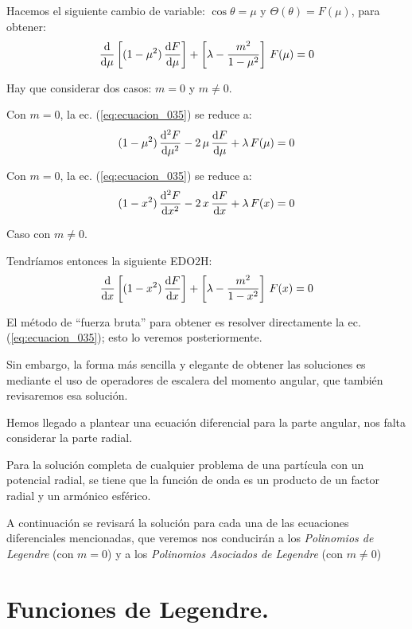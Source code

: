 Hacemos el siguiente cambio de variable: $\cos \theta = \mu$ y $\Theta(\theta) = F(\mu)$, para obtener:
\begin{align}
\dv{\mu} \left[ (1 - \mu^{2}) \, \dv{F}{\mu} \right] + \left[ \lambda - \dfrac{m^{2}}{1 - \mu^{2}} \right] \, F(\mu) = 0
\label{eq:ecuacion_035}
\end{align}

Hay que considerar dos casos: $m = 0$ y $m \neq 0$.
\par
Con $m = 0$, la ec. (\ref{eq:ecuacion_035}) se reduce a:
\begin{align}
(1 - \mu^{2}) \, \dv[2]{F}{\mu} - 2  \, \mu \, \dv{F}{\mu} + \lambda \, F(\mu) = 0
\label{eq:ecuacion_036a}
\end{align}

Con $m = 0$, la ec. (\ref{eq:ecuacion_035}) se reduce a:
\begin{align}
(1 - x^{2}) \, \dv[2]{F}{x} - 2  \, x \, \dv{F}{x} + \lambda \, F(x) = 0
\label{eq:ecuacion_036b}
\end{align}

Caso con $m \neq 0$.

Tendríamos entonces la siguiente EDO2H:
\begin{align}
\dv{x} \left[ (1 - x^{2}) \, \dv{F}{x} \right] + \left[ \lambda - \dfrac{m^{2}}{1 - x^{2}} \right] \, F(x) = 0
\label{eq:ecuacion_037}
\end{align}

El método de \enquote{fuerza bruta} para obtener es resolver directamente la ec. (\ref{eq:ecuacion_035}); esto lo veremos posteriormente.
\par
Sin embargo, la forma más sencilla y elegante de obtener las soluciones es mediante el uso de operadores de escalera del momento angular, que también revisaremos esa solución.
\par
Hemos llegado a plantear una ecuación diferencial para la parte angular, nos falta considerar la parte radial.
\par
Para la solución completa de cualquier problema de una partícula con un potencial radial, se tiene que la función de onda es un producto de un factor radial y un armónico esférico.
\par
A continuación se revisará la solución para cada una de las ecuaciones diferenciales mencionadas, que veremos nos conducirán a los \emph{Polinomios de Legendre} (con $m = 0$) y a los \emph{Polinomios Asociados de Legendre} (con $m \neq 0$)

\section{Funciones de Legendre.}

